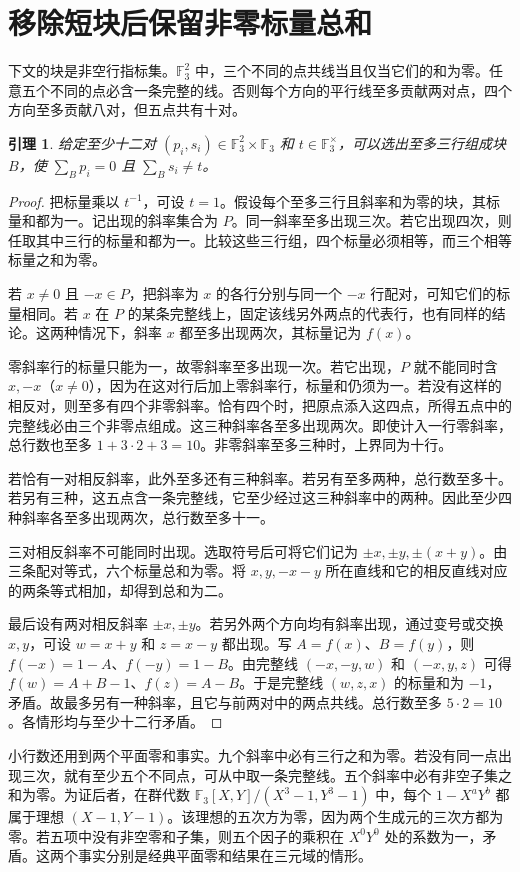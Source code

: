 \documentclass[UTF8,scheme=plain,a4paper,11pt]{ctexart}
\newcommand{\F}{\mathbb F_3}
\newtheorem{lem}[thm]{引理}
\begin{document}
\newpage
\section{移除短块后保留非零标量总和}
下文的块是非空行指标集。$\F^2$ 中，三个不同的点共线当且仅当它们的和为零。任意五个不同的点必含一条完整的线。否则每个方向的平行线至多贡献两对点，四个方向至多贡献八对，但五点共有十对。
\begin{lem}\label{short}
给定至少十二对 $(p_i,s_i)\in\F^2\times\F$ 和 $t\in\F^\times$，可以选出至多三行组成块 $B$，使 $\sum_Bp_i=0$ 且 $\sum_Bs_i\ne t$。
\end{lem}
\begin{proof}
把标量乘以 $t^{-1}$，可设 $t=1$。假设每个至多三行且斜率和为零的块，其标量和都为一。记出现的斜率集合为 $P$。同一斜率至多出现三次。若它出现四次，则任取其中三行的标量和都为一。比较这些三行组，四个标量必须相等，而三个相等标量之和为零。

若 $x\ne0$ 且 $-x\in P$，把斜率为 $x$ 的各行分别与同一个 $-x$ 行配对，可知它们的标量相同。若 $x$ 在 $P$ 的某条完整线上，固定该线另外两点的代表行，也有同样的结论。这两种情况下，斜率 $x$ 都至多出现两次，其标量记为 $f(x)$。

零斜率行的标量只能为一，故零斜率至多出现一次。若它出现，$P$ 就不能同时含 $x,-x$（$x\ne0$），因为在这对行后加上零斜率行，标量和仍须为一。若没有这样的相反对，则至多有四个非零斜率。恰有四个时，把原点添入这四点，所得五点中的完整线必由三个非零点组成。这三种斜率各至多出现两次。即使计入一行零斜率，总行数也至多 $1+3\cdot2+3=10$。非零斜率至多三种时，上界同为十行。

若恰有一对相反斜率，此外至多还有三种斜率。若另有至多两种，总行数至多十。若另有三种，这五点含一条完整线，它至少经过这三种斜率中的两种。因此至少四种斜率各至多出现两次，总行数至多十一。

三对相反斜率不可能同时出现。选取符号后可将它们记为 $\pm x,\pm y,\pm(x+y)$。由三条配对等式，六个标量总和为零。将 $x,y,-x-y$ 所在直线和它的相反直线对应的两条等式相加，却得到总和为二。

最后设有两对相反斜率 $\pm x,\pm y$。若另外两个方向均有斜率出现，通过变号或交换 $x,y$，可设 $w=x+y$ 和 $z=x-y$ 都出现。写 $A=f(x)$、$B=f(y)$，则 $f(-x)=1-A$、$f(-y)=1-B$。由完整线 $(-x,-y,w)$ 和 $(-x,y,z)$ 可得 $f(w)=A+B-1$、$f(z)=A-B$。于是完整线 $(w,z,x)$ 的标量和为 $-1$，矛盾。故最多另有一种斜率，且它与前两对中的两点共线。总行数至多 $5\cdot2=10$。各情形均与至少十二行矛盾。
\end{proof}

小行数还用到两个平面零和事实。九个斜率中必有三行之和为零。若没有同一点出现三次，就有至少五个不同点，可从中取一条完整线。五个斜率中必有非空子集之和为零。为证后者，在群代数 $\F[X,Y]/(X^3-1,Y^3-1)$ 中，每个 $1-X^aY^b$ 都属于理想 $(X-1,Y-1)$。该理想的五次方为零，因为两个生成元的三次方都为零。若五项中没有非空零和子集，则五个因子的乘积在 $X^0Y^0$ 处的系数为一，矛盾。这两个事实分别是经典平面零和结果在三元域的情形\cite{reiher,olson}。
\end{document}
